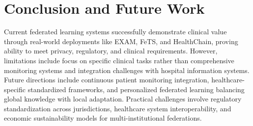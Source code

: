\documentclass[8pt]{article}
\begin{document}
\section{Conclusion and Future Work}

Current federated learning systems successfully demonstrate clinical value through real-world deployments like EXAM, FeTS, and HealthChain, proving ability to meet privacy, regulatory, and clinical requirements. However, limitations include focus on specific clinical tasks rather than comprehensive monitoring systems and integration challenges with hospital information systems. Future directions include continuous patient monitoring integration, healthcare-specific standardized frameworks, and personalized federated learning balancing global knowledge with local adaptation. Practical challenges involve regulatory standardization across jurisdictions, healthcare system interoperability, and economic sustainability models for multi-institutional federations.
\end{document}
